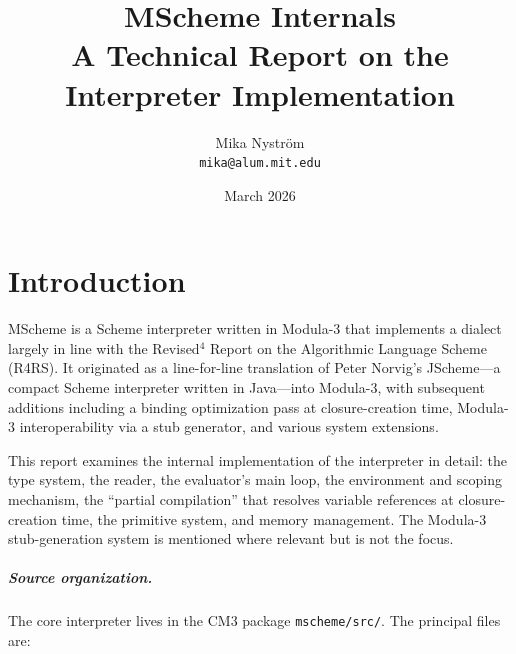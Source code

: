 \documentclass[12pt]{report}
\title{\bfseries\sffamily\fontsize{24.88}{30}\selectfont
  MScheme Internals\\[0.5em]
  \large A Technical Report on the Interpreter Implementation}
\author{Mika Nystr\"om \\ {\tt mika@alum.mit.edu}}
\date{March 2026}
\begin{document}
\maketitle
\thispagestyle{empty}

\newpage
\tableofcontents
\newpage

\chapter{Introduction}

MScheme is a Scheme interpreter written in Modula-3 that implements a
dialect largely in line with the Revised$^4$ Report on the Algorithmic
Language Scheme (R4RS).  It originated as a line-for-line translation
of Peter Norvig's JScheme---a compact Scheme interpreter written in
Java---into Modula-3, with subsequent additions including a binding
optimization pass at closure-creation time, Modula-3 interoperability
via a stub generator, and various system extensions.

This report examines the internal implementation of the interpreter
in detail: the type system, the reader, the evaluator's main loop,
the environment and scoping mechanism, the ``partial compilation''
that resolves variable references at closure-creation time, the
primitive system, and memory management.  The Modula-3 stub-generation
system is mentioned where relevant but is not the focus.

\paragraph{Source organization.}
The core interpreter lives in the CM3 package \texttt{mscheme/src/}.
The principal files are:
\end{document}
